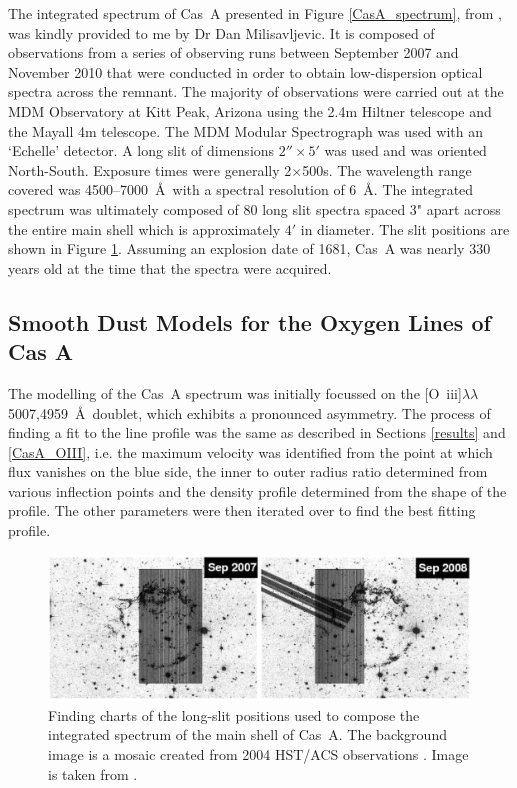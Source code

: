 The integrated spectrum of Cas~A presented in Figure \ref{CasA_spectrum}, from \citet{Milisavljevic2013}, was kindly provided to me by Dr Dan Milisavljevic.  It is composed of observations from a series of observing runs between September 2007 and November 2010 that were conducted in order to obtain low-dispersion optical spectra across the remnant.  The majority of observations were carried out at the MDM Observatory at Kitt Peak, Arizona using the 2.4m Hiltner telescope and the Mayall 4m telescope.  The MDM Modular Spectrograph was used with an `Echelle' detector.  A long slit of dimensions $2''\times5'$ was used and was oriented North-South.  Exposure times were generally 2$\times$500s.  The wavelength range covered was 4500--7000~\AA\  with a spectral resolution of 6~\AA.  
The integrated spectrum was ultimately composed of 80 long slit spectra spaced 3" apart across the entire main shell which is approximately $4'$ in diameter.  The slit positions are shown in Figure \ref{CasA_slit_positions}.  Assuming an explosion date of 1681, Cas~A was nearly 330 years old at the time that the spectra were acquired.


\subsection{Smooth Dust Models for the Oxygen Lines of Cas A}
\label{scn:CasA_smooth}
The modelling of the Cas~A spectrum was initially focussed on the [O~{\sc iii}]$\lambda\lambda$5007,4959~\AA\  doublet, which exhibits a pronounced asymmetry.  The process of finding a fit to the line profile was the same as described in Sections \ref{results} and \ref{CasA_OIII}, i.e. the maximum velocity was identified from the point at which flux vanishes on the blue side, the inner to outer radius ratio determined from various inflection points and the density profile determined from the shape of the profile.  The other parameters were then iterated over to find the best fitting profile.  

\begin{figure}
\centering
\includegraphics[clip=true,scale=0.3, trim=0 0 0 0]{chapters/chapter6/figs/CasA/slit_positions.png}
\caption{Finding charts of the long-slit positions used to compose the integrated spectrum of the main shell of Cas~A.  The background image is a mosaic created from 2004 HST/ACS observations \citep{Fesen2006a}.  Image is taken from \citet{Milisavljevic2013}.}
\label{CasA_slit_positions}
\end{figure}

